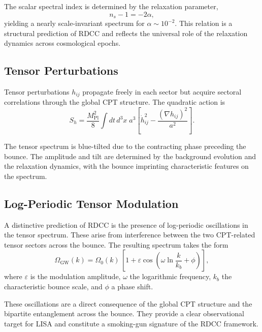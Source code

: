 \documentclass[11pt,a4paper]{article}
\begin{document}
The scalar spectral index is determined by the relaxation parameter,
\begin{equation}
    n_{s} - 1 = -2\alpha,
\end{equation}
yielding a nearly scale-invariant spectrum for \(\alpha \sim 10^{-2}\). This
relation is a structural prediction of RDCC and reflects the universal role of
the relaxation dynamics across cosmological epochs.

\subsection{Tensor Perturbations}

Tensor perturbations \(h_{ij}\) propagate freely in each sector but acquire
sectoral correlations through the global CPT structure. The quadratic action is
\begin{equation}
    S_{h}
        = \frac{M_{\mathrm{Pl}}^{2}}{8}
          \int dt\,d^{3}x\;
          a^{3}\left[
              \dot{h}_{ij}^{2}
              - \frac{(\nabla h_{ij})^{2}}{a^{2}}
          \right].
\end{equation}

The tensor spectrum is blue-tilted due to the contracting phase preceding the
bounce. The amplitude and tilt are determined by the background evolution and
the relaxation dynamics, with the bounce imprinting characteristic features on
the spectrum.

\subsection{Log-Periodic Tensor Modulation}

A distinctive prediction of RDCC is the presence of log-periodic oscillations in
the tensor spectrum. These arise from interference between the two CPT-related
tensor sectors across the bounce. The resulting spectrum takes the form
\begin{equation}
    \Omega_{\mathrm{GW}}(k)
        = \Omega_{0}(k)\,
          \left[
              1
              + \varepsilon
                \cos\!\left(
                    \omega \ln\frac{k}{k_{b}}
                    + \phi
                \right)
          \right],
\end{equation}
where \(\varepsilon\) is the modulation amplitude, \(\omega\) the logarithmic
frequency, \(k_{b}\) the characteristic bounce scale, and \(\phi\) a phase shift.

These oscillations are a direct consequence of the global CPT structure and the
bipartite entanglement across the bounce. They provide a clear observational
target for LISA and constitute a smoking-gun signature of the RDCC framework.
\end{document}
